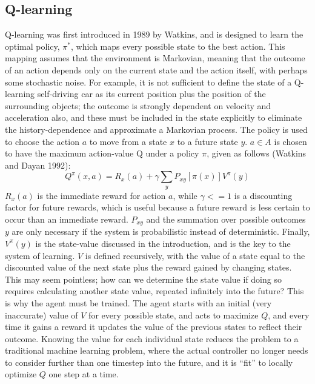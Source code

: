\documentclass[journal,onecolumn]{IEEEtran}
\begin{document}
\subsection{Q-learning} Q-learning was first introduced in 1989 by Watkins, and is designed to learn the optimal policy, $\pi^{*}$, which maps every possible state to the best action. This mapping assumes that the environment is Markovian, meaning that the outcome of an action depends only on the current state and the action itself, with perhaps some stochastic noise.  For example, it is not sufficient to define the state of a Q-learning self-driving car as its current position plus the position of the surrounding objects; the outcome is strongly dependent on velocity and acceleration also, and these must be included in the state explicitly to eliminate the history-dependence and approximate a Markovian process.  The policy is used to choose the action $a$ to move from a state $x$ to a future state $y$. $a \in A$ is chosen to have the maximum action-value Q under a policy $\pi$, given as follows (Watkins and Dayan 1992):
\[
{{Q}^{\pi }}(x,a)={{R}_{x}}(a)+\gamma \sum\limits_{y}{{{P}_{xy}}[\pi (x)]{{V}^{\pi }}\left( y \right)}
\]
$R_{x}(a)$ is the immediate reward for action $a$, while $\gamma <= 1$ is a discounting factor for future rewards, which is useful because a future reward is less certain to occur than an immediate reward.  $P_{xy}$ and the summation over possible outcomes $y$ are only necessary if the system is probabilistic instead of deterministic.  Finally, $V^{\pi}(y)$ is the state-value discussed in the introduction, and is the key to the system of learning.  $V$ is defined recursively, with the value of a state equal to the discounted value of the next state plus the reward gained by changing states.  This may seem pointless; how can we determine the state value if doing so requires calculating another state value, repeated infinitely into the future?  This is why the agent must be trained.  The agent starts with an initial (very inaccurate) value of $V$ for every possible state, and acts to maximize $Q$, and every time it gains a reward it updates the value of the previous states to reflect their outcome.  Knowing the value for each individual state reduces the problem to a traditional machine learning problem, where the actual controller no longer needs to consider further than one timestep into the future, and it is “fit” to locally optimize $Q$ one step at a time. \\\\
\end{document}
